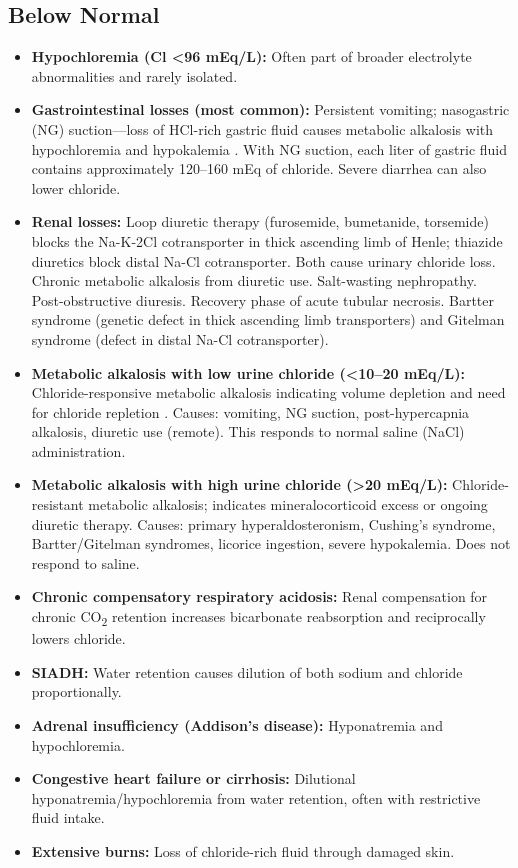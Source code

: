 \subsection*{Below Normal}
\begin{itemize}
  \item \textbf{Hypochloremia (Cl <96 mEq/L):} Often part of broader electrolyte abnormalities and rarely isolated.
  \item \textbf{Gastrointestinal losses (most common):} Persistent vomiting; nasogastric (NG) suction---loss of HCl-rich gastric fluid causes metabolic alkalosis with hypochloremia and hypokalemia \cite{gennari2008acid}. With NG suction, each liter of gastric fluid contains approximately 120--160 mEq of chloride. Severe diarrhea can also lower chloride.
  \item \textbf{Renal losses:} Loop diuretic therapy (furosemide, bumetanide, torsemide) blocks the Na-K-2Cl cotransporter in thick ascending limb of Henle; thiazide diuretics block distal Na-Cl cotransporter. Both cause urinary chloride loss. Chronic metabolic alkalosis from diuretic use. Salt-wasting nephropathy. Post-obstructive diuresis. Recovery phase of acute tubular necrosis. Bartter syndrome (genetic defect in thick ascending limb transporters) and Gitelman syndrome (defect in distal Na-Cl cotransporter).
  \item \textbf{Metabolic alkalosis with low urine chloride (<10--20 mEq/L):} Chloride-responsive metabolic alkalosis indicating volume depletion and need for chloride repletion \cite{galla2000metabolic}. Causes: vomiting, NG suction, post-hypercapnia alkalosis, diuretic use (remote). This responds to normal saline (NaCl) administration.
  \item \textbf{Metabolic alkalosis with high urine chloride (>20 mEq/L):} Chloride-resistant metabolic alkalosis; indicates mineralocorticoid excess or ongoing diuretic therapy. Causes: primary hyperaldosteronism, Cushing's syndrome, Bartter/Gitelman syndromes, licorice ingestion, severe hypokalemia. Does not respond to saline.
  \item \textbf{Chronic compensatory respiratory acidosis:} Renal compensation for chronic CO\textsubscript{2} retention increases bicarbonate reabsorption and reciprocally lowers chloride.
  \item \textbf{SIADH:} Water retention causes dilution of both sodium and chloride proportionally.
  \item \textbf{Adrenal insufficiency (Addison's disease):} Hyponatremia and hypochloremia.
  \item \textbf{Congestive heart failure or cirrhosis:} Dilutional hyponatremia/hypochloremia from water retention, often with restrictive fluid intake.
  \item \textbf{Extensive burns:} Loss of chloride-rich fluid through damaged skin.
\end{itemize}

